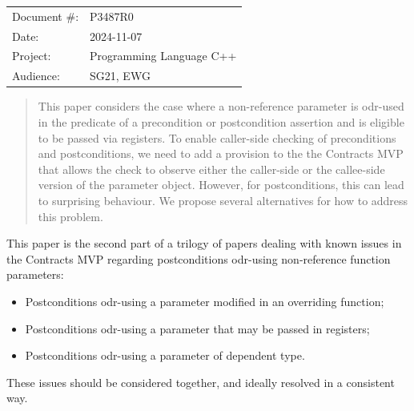 \begin{tabular}{ll}
Document \#: & P3487R0 \\
Date: &2024-11-07 \\
Project: & Programming Language C++ \\
Audience: & SG21, EWG
\end{tabular}

\begin{abstract}
This paper considers the case where a non-reference parameter is odr-used in the predicate of a precondition or postcondition assertion and is eligible to be passed via registers. To enable caller-side checking of preconditions and postconditions, we need to add a provision to the the Contracts MVP \cite{P2900R10} that allows the check to observe either the caller-side or the callee-side version of the parameter object. However, for postconditions, this can lead to surprising behaviour. We propose several alternatives for how to address this problem.
\end{abstract}







This paper is the second part of a trilogy of papers dealing with known issues in the Contracts MVP \cite{P2900R10} regarding postconditions odr-using non-reference function parameters:
\begin{itemize}
\item \cite{D3484R1} Postconditions odr-using a parameter modified in an overriding function;
\item \cite{D3487R0} Postconditions odr-using a parameter that may be passed in registers;
\item \cite{D3489R0} Postconditions odr-using a parameter of dependent type.
\end{itemize}
These issues should be considered together, and ideally resolved in a consistent way.

